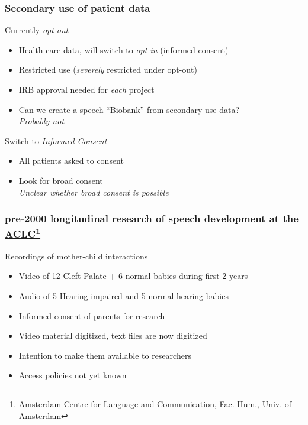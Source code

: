 \documentclass[xcolor=dvipsnames]{beamer}
\begin{document}
\begin{frame}
	\frametitle{Secondary use of patient data}
		
	\begin{block}{Currently {\em opt-out}}
	\begin{itemize}
	\item Health care data, will switch to {\em opt-in} (informed consent)
	\item Restricted use ({\em severely} restricted under opt-out) 
	\item IRB approval needed for {\color{Maroon} \em each} project
	\item Can we create a speech ``Biobank'' from secondary use data? \\
	{\em Probably not}
	\end{itemize}
	\end{block}	
	\begin{block}{Switch to {\em Informed Consent}}
	\begin{itemize}
	\item All patients asked to consent
	\item Look for broad consent \\
	{\em Unclear whether broad consent is possible}
	\end{itemize}
	\end{block}	
	
\end{frame}

\begin{frame}
	\frametitle{pre-2000 longitudinal research of speech development at the \href{http://aclc.uva.nl}{ACLC}\footnote[frame]{\scriptsize \href{http://aclc.uva.nl}{\underline{Amsterdam Centre for Language and Communication}}, Fac. Hum., Univ. of Amsterdam}}
		
	\begin{block}{Recordings of mother-child interactions}
	\begin{itemize}
	\item Video of 12 Cleft Palate + 6 normal babies during first 2 years {\scriptsize \cite{koopmans1986early}}
	\item Audio of 5 Hearing impaired and 5 normal hearing babies {\scriptsize \cite{clement1994development,vanderstelt2008deaf}}
	\item Informed consent of parents for research
	\item Video material digitized, text files are now digitized
	\item Intention to make them available to researchers
	\item Access policies not yet known
	\end{itemize}
	\end{block}	
	
\end{frame}
\end{document}
